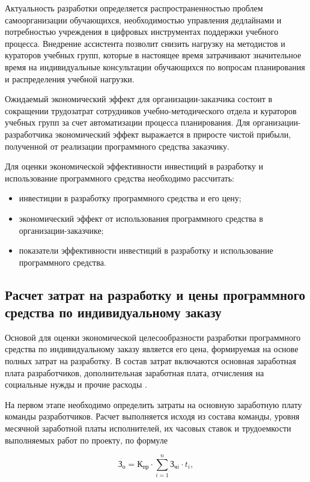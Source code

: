 Актуальность разработки определяется распространенностью проблем самоорганизации обучающихся, необходимостью управления дедлайнами и потребностью учреждения в цифровых инструментах поддержки учебного процесса. Внедрение ассистента позволит снизить нагрузку на методистов и кураторов учебных групп, которые в настоящее время затрачивают значительное время на индивидуальные консультации обучающихся по вопросам планирования и распределения учебной нагрузки.

Ожидаемый экономический эффект для организации-заказчика состоит в сокращении трудозатрат сотрудников учебно-методического отдела и кураторов учебных групп за счет автоматизации процесса планирования. Для организации-разработчика экономический эффект выражается в приросте чистой прибыли, полученной от реализации программного средства заказчику.

Для оценки экономической эффективности инвестиций в разработку и использование программного средства необходимо рассчитать:
\begin{itemize}
    \item инвестиции в разработку программного средства и его цену;
    \item экономический эффект от использования программного средства в организации-заказчике;
    \item показатели эффективности инвестиций в разработку и использование программного средства.
\end{itemize}


\subsection{Расчет затрат на разработку и цены программного средства по индивидуальному заказу}

Основой для оценки экономической целесообразности разработки программного средства по индивидуальному заказу является его цена, формируемая на основе полных затрат на разработку. В состав затрат включаются основная заработная плата разработчиков, дополнительная заработная плата, отчисления на социальные нужды и прочие расходы \cite{Economics}.

На первом этапе необходимо определить затраты на основную заработную плату команды разработчиков. Расчет выполняется исходя из состава команды, уровня месячной заработной платы исполнителей, их часовых ставок и трудоемкости выполняемых работ по проекту, по формуле

\begin{equation}
    \text{З}_{\text{о}}=\text{К}_{\text{пр}}\cdot \sum_{i=1}^{n}{\text{З}_{\text{ч}i}\cdot t_{i}},
\end{equation}

